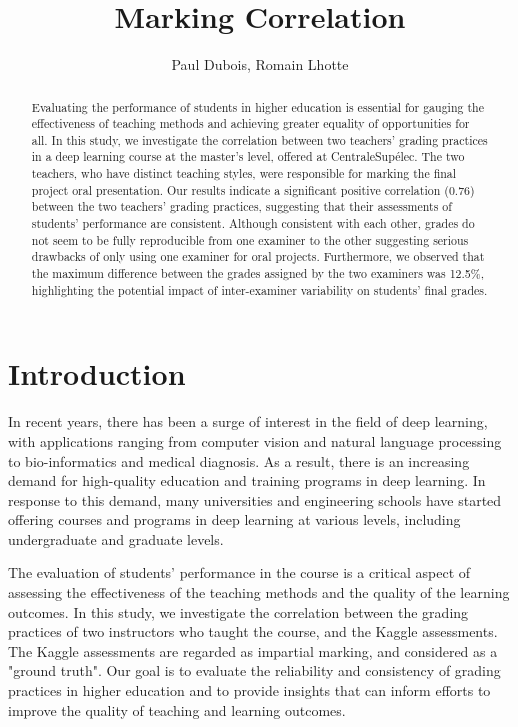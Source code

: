 \documentclass[a4paper]{article}
\title{Marking Correlation}
\author{Paul Dubois, Romain Lhotte}
\begin{document}
	\maketitle
	\begin{abstract}
		Evaluating the performance of students in higher education is essential for gauging the effectiveness of teaching methods and achieving greater equality of opportunities for all.
		In this study, we investigate the correlation between two teachers' grading practices in a deep learning course at the master's level, offered at CentraleSupélec.
		The two teachers, who have distinct teaching styles, were responsible for marking the final project oral presentation.
		Our results indicate a significant positive correlation (0.76) between the two teachers' grading practices, suggesting that their assessments of students' performance are consistent.
		Although consistent with each other, grades do not seem to be fully reproducible from one examiner to the other suggesting serious drawbacks of only using one examiner for oral projects.
		Furthermore, we observed that the maximum difference between the grades assigned by the two examiners was 12.5\%, highlighting the potential impact of inter-examiner variability on students' final grades.
	\end{abstract}
	
	\section{Introduction}
	In recent years, there has been a surge of interest in the field of deep learning, with applications ranging from computer vision and natural language processing to bio-informatics and medical diagnosis.
	As a result, there is an increasing demand for high-quality education and training programs in deep learning.
	In response to this demand, many universities and engineering schools have started offering courses and programs in deep learning at various levels, including undergraduate and graduate levels.
	
	The evaluation of students' performance in the course is a critical aspect of assessing the effectiveness of the teaching methods and the quality of the learning outcomes.
	In this study, we investigate the correlation between the grading practices of two instructors who taught the course, and the Kaggle assessments.
	The Kaggle assessments are regarded as impartial marking, and considered as a "ground truth".
	Our goal is to evaluate the reliability and consistency of grading practices in higher education and to provide insights that can inform efforts to improve the quality of teaching and learning outcomes.
	
\end{document}
